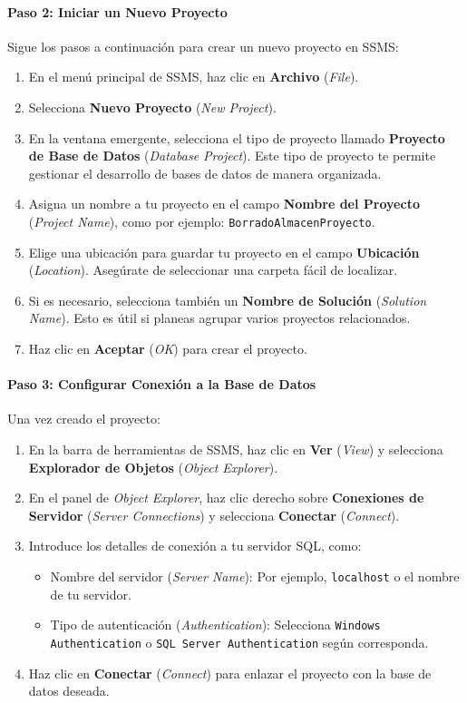 \documentclass{article}
\begin{document}
	\paragraph{Paso 2: Iniciar un Nuevo Proyecto}  
	Sigue los pasos a continuación para crear un nuevo proyecto en SSMS:
	\begin{enumerate}
		\item En el menú principal de SSMS, haz clic en \textbf{Archivo} (\textit{File}).
		\item Selecciona \textbf{Nuevo Proyecto} (\textit{New Project}).
		\item En la ventana emergente, selecciona el tipo de proyecto llamado \textbf{Proyecto de Base de Datos} (\textit{Database Project}). Este tipo de proyecto te permite gestionar el desarrollo de bases de datos de manera organizada.
		\item Asigna un nombre a tu proyecto en el campo \textbf{Nombre del Proyecto} (\textit{Project Name}), como por ejemplo: \texttt{BorradoAlmacenProyecto}.
		\item Elige una ubicación para guardar tu proyecto en el campo \textbf{Ubicación} (\textit{Location}). Asegúrate de seleccionar una carpeta fácil de localizar.
		\item Si es necesario, selecciona también un \textbf{Nombre de Solución} (\textit{Solution Name}). Esto es útil si planeas agrupar varios proyectos relacionados.
		\item Haz clic en \textbf{Aceptar} (\textit{OK}) para crear el proyecto.
	\end{enumerate}
	
	\paragraph{Paso 3: Configurar Conexión a la Base de Datos}  
	Una vez creado el proyecto:
	\begin{enumerate}
		\item En la barra de herramientas de SSMS, haz clic en \textbf{Ver} (\textit{View}) y selecciona \textbf{Explorador de Objetos} (\textit{Object Explorer}).
		\item En el panel de \textit{Object Explorer}, haz clic derecho sobre \textbf{Conexiones de Servidor} (\textit{Server Connections}) y selecciona \textbf{Conectar} (\textit{Connect}).
		\item Introduce los detalles de conexión a tu servidor SQL, como:
		\begin{itemize}
			\item Nombre del servidor (\textit{Server Name}): Por ejemplo, \texttt{localhost} o el nombre de tu servidor.
			\item Tipo de autenticación (\textit{Authentication}): Selecciona \texttt{Windows Authentication} o \texttt{SQL Server Authentication} según corresponda.
		\end{itemize}
		\item Haz clic en \textbf{Conectar} (\textit{Connect}) para enlazar el proyecto con la base de datos deseada.
	\end{enumerate}
	
\end{document}
